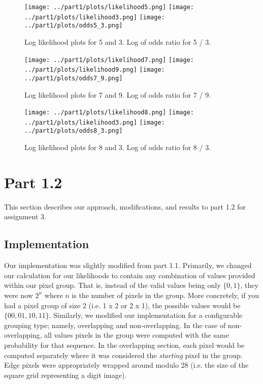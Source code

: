 \documentclass[10pt,a4paper]{article}
\begin{document}
\begin{figure}[H]
\hspace*{-1.5in}
\texttt{[image: ../part1/plots/likelihood5.png]}%
\texttt{[image: ../part1/plots/likelihood3.png]}%
\texttt{[image: ../part1/plots/odds5\_3.png]}
\caption{Log likelihood plots for 5 and 3. Log of odds ratio for 5 / 3.}
\label{fig:odds5_3}
\end{figure}

\begin{figure}[H]
\hspace*{-1.5in}
\texttt{[image: ../part1/plots/likelihood7.png]}%
\texttt{[image: ../part1/plots/likelihood9.png]}%
\texttt{[image: ../part1/plots/odds7\_9.png]}
\caption{Log likelihood plots for 7 and 9. Log of odds ratio for 7 / 9.}
\label{fig:odds7_9}
\end{figure}

\begin{figure}[H]
\hspace*{-1.5in}
\texttt{[image: ../part1/plots/likelihood8.png]}%
\texttt{[image: ../part1/plots/likelihood3.png]}%
\texttt{[image: ../part1/plots/odds8\_3.png]}
\caption{Log likelihood plots for 8 and 3. Log of odds ratio for 8 / 3.}
\label{fig:odds8_3}
\end{figure}

\newpage

\section{Part 1.2}
This section describes our approach, modifications, and results to part 1.2 for assignment 3.

\subsection{Implementation}
Our implementation was slightly modified from part 1.1. Primarily, we changed our calculation for our likelihoods to contain any combination of values provided within our pixel group. That is, instead of the valid values being only $\{0, 1\}$, they were now $2^n$ where $n$ is the number of pixels in the group. More concretely, if you had a pixel group of size 2 (i.e. 1 x 2 or 2 x 1), the possible values would be $\{00, 01, 10, 11\}$. Similarly, we modified our implementation for a configurable grouping type; namely, overlapping and non-overlapping. In the case of non-overlapping, all values pixels in the group were computed with the same probability for that sequence. In the overlapping section, each pixel would be computed separately where it was considered the \emph{starting} pixel in the group. Edge pixels were appropriately wrapped around modulo 28 (i.e. the size of the square grid representing a digit image).
\end{document}
